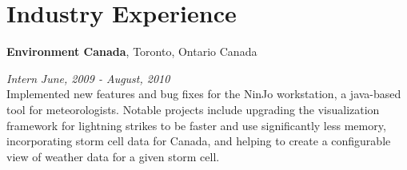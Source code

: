 \section{\sc Industry Experience}

{\bf Environment Canada}, Toronto, Ontario Canada
\vspace{-.3cm}


{\em Intern} \hfill {\em June, 2009 - August, 2010}\\
Implemented new features and bug fixes for the NinJo workstation, a java-based tool for meteorologists. 
Notable projects include upgrading the visualization framework for lightning strikes to be faster and use significantly less memory,
incorporating storm cell data for Canada,
and helping to create a configurable view of weather data for a given storm cell.